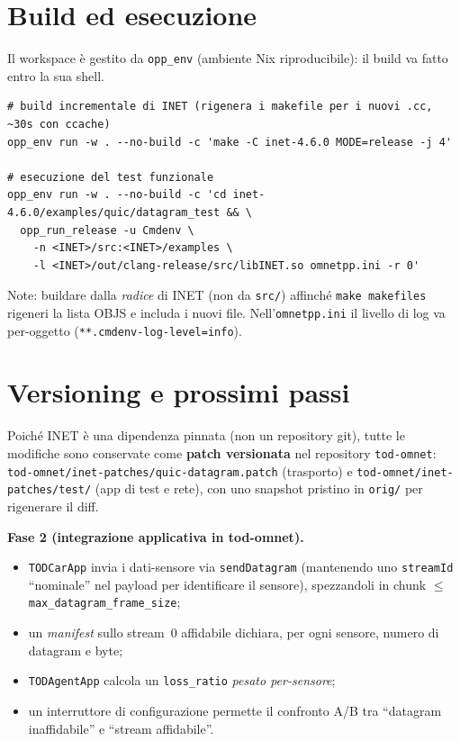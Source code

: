 \documentclass[11pt,a4paper]{article}
\newcommand{\code}[1]{\texttt{#1}}
\begin{document}
\section{Build ed esecuzione}
Il workspace \`e gestito da \code{opp\_env} (ambiente Nix riproducibile): il build va fatto entro la sua shell.

\begin{lstlisting}[style=sh]
# build incrementale di INET (rigenera i makefile per i nuovi .cc, ~30s con ccache)
opp_env run -w . --no-build -c 'make -C inet-4.6.0 MODE=release -j 4'

# esecuzione del test funzionale
opp_env run -w . --no-build -c 'cd inet-4.6.0/examples/quic/datagram_test && \
  opp_run_release -u Cmdenv \
    -n <INET>/src:<INET>/examples \
    -l <INET>/out/clang-release/src/libINET.so omnetpp.ini -r 0'
\end{lstlisting}
\noindent Note: buildare dalla \emph{radice} di INET (non da \code{src/}) affinch\'e \code{make makefiles}
rigeneri la lista OBJS e includa i nuovi file. Nell'\code{omnetpp.ini} il livello di log va per-oggetto
(\code{**.cmdenv-log-level=info}).

\section{Versioning e prossimi passi}
Poich\'e INET \`e una dipendenza pinnata (non un repository git), tutte le modifiche sono conservate come
\textbf{patch versionata} nel repository \code{tod-omnet}: \code{tod-omnet/inet-patches/quic-datagram.patch}
(trasporto) e \code{tod-omnet/inet-patches/test/} (app di test e rete), con uno snapshot pristino in
\code{orig/} per rigenerare il diff.

\medskip
\noindent\textbf{Fase 2 (integrazione applicativa in tod-omnet).}
\begin{itemize}[nosep,leftmargin=1.4em]
  \item \code{TODCarApp} invia i dati-sensore via \code{sendDatagram} (mantenendo uno \code{streamId}
    ``nominale'' nel payload per identificare il sensore), spezzandoli in chunk $\le$ \code{max\_datagram\_frame\_size};
  \item un \emph{manifest} sullo stream~0 affidabile dichiara, per ogni sensore, numero di datagram e byte;
  \item \code{TODAgentApp} calcola un \code{loss\_ratio} \emph{pesato per-sensore};
  \item un interruttore di configurazione permette il confronto A/B tra ``datagram inaffidabile'' e ``stream
    affidabile''.
\end{itemize}
\end{document}
